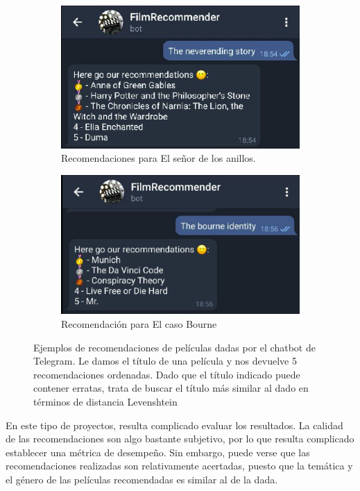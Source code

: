 \begin{figure}[H]
\begin{subfigure}{.5\textwidth}
  \centering
  \includegraphics[width=.9\linewidth]{contenido/imagenes/sc3.png}
  \caption{Recomendaciones para El señor de los anillos.}
  \label{fig:sc3}
\end{subfigure}%
\begin{subfigure}{.5\textwidth}
  \centering
  \includegraphics[width=.9\linewidth]{contenido/imagenes/sc4.png}
  \caption{Recomendación para El caso Bourne}
  \label{fig:sc4}
\end{subfigure}
\caption{Ejemplos de recomendaciones de películas dadas por el chatbot de Telegram. Le damos el título de una película y nos devuelve 5 recomendaciones ordenadas. Dado que el título indicado puede contener erratas, trata de buscar el título más similar al dado en términos de distancia Levenshtein}
\label{fig:TelegramResults}
\end{figure}

En este tipo de proyectos, resulta complicado evaluar los resultados. La calidad de las recomendaciones son algo bastante subjetivo, por lo que resulta complicado establecer una métrica de desempeño. Sin embargo, puede verse que las recomendaciones realizadas son relativamente acertadas, puesto que la temática y el género de las películas recomendadas es similar al de la dada.\\

